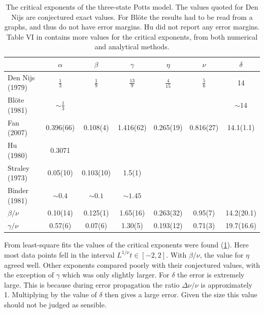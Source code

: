 \documentclass[11pt, a4paper]{report} %
\begin{document}
\begin{table}[htb]
	\begin{adjustbox}{center}
		\centering
		\renewcommand{\arraystretch}{1.5}
		\begin{tabular}{l | c c c c c c}
			\hline
			& \(\alpha\) & \(\beta\) & \(\gamma\) & \(\eta\) & \(\nu\) & \(\delta\) \\\hline
			Den Nijs (1979)\cite{nijs:1979,baxter:1989} & \(\frac{1}{3}\) & \(\frac{1}{9}\) & \(\frac{13}{9}\) & \(\frac{4}{15}\) & \(\frac{5}{6}\) & 14 \\
			Blöte (1981)\cite{blote:1981} & \(\sim\frac{1}{3}\) & & & & & \(\sim14\)\\
			Fan (2007)\cite{fan:2007} & 0.396(66) & 0.108(4) & 1.416(62) & 0.265(19) & 0.816(27) & 14.1(1.1) \\
			Hu (1980)\cite{hu:1980} & 0.3071 & \\
			Straley (1973)\cite{straley:1973} & 0.05(10)& 0.103(10) & 1.5(1)\\
			Binder (1981)\cite{binder:1981a} & \(\sim0.4\) & \(\sim0.1\) & \(\sim1.45\)\\
			\(\beta/\nu\) & 0.10(14) & 0.125(1) & 1.65(16) & 0.263(32) & 0.95(7) & 14.2(20.1)\\
			\(\gamma/\nu\) & 0.57(6) & 0.07(6) & 1.30(5) & 0.193(12) & 0.71(3) & 19.7(16.6)\\\hline
		\end{tabular}
	\end{adjustbox}
	\caption{The critical exponents of the three-state Potts model. The values quoted for Den Nijs are conjectured exact values. For Blöte the results had to be read from a graphs, and thus do not have error margins. Hu did not report any error margins.
	Table VI in \cite{wu:1982} contains more values for the critical exponents, from both numerical and analytical methods.}
	\label{tab:potts_critical_exponents}
\end{table}

From least-square fits the values of the critical exponents were found (\cref{tab:potts_critical_exponents}).
Here most data points fell in the interval \(L^{1/\nu}t \in [-2, 2]\).
With \(\beta/\nu\), the value for \(\eta\) agreed well.
Other exponents compared poorly with their conjectured values, with the exception of \(\gamma\) which was only slightly larger.
For \(\delta\) the error is extremely large. This is because during error propagation the ratio \(\Delta \nu / \nu\) is approximately 1.
Multiplying by the value of \(\delta\) then gives a large error.
Given the size this value should not be judged as sensible.
\end{document}
